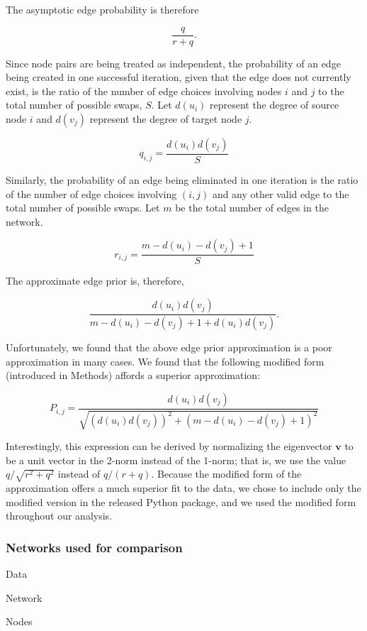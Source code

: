 The asymptotic edge probability is therefore

\[\frac{q}{r + q}.\]

Since node pairs are being treated as independent, the probability of an edge being created in one successful iteration, given that the edge does not currently exist, is the ratio of the number of edge choices involving nodes \(i\) and \(j\) to the total number of possible swaps, \(S\).
Let \(d(u_i)\) represent the degree of source node \(i\) and \(d(v_j)\) represent the degree of target node \(j\).

\[q_{i,j} = \frac{d(u_i)d(v_j)}{S}\]

Similarly, the probability of an edge being eliminated in one iteration is the ratio of the number of edge choices involving \((i,j)\) and any other valid edge to the total number of possible swaps.
Let \(m\) be the total number of edges in the network.

\[r_{i,j} = \frac{m - d(u_i) - d(v_j) + 1}{S}\]

The approximate edge prior is, therefore,

\[\frac{d(u_i)d(v_j)}{m - d(u_i) - d(v_j) + 1 + d(u_i)d(v_j)}.\]

Unfortunately, we found that the above edge prior approximation is a poor approximation in many cases.
We found that the following modified form (introduced in Methods) affords a superior approximation:

\begin{equation}
    P_{i,j} = \frac{d(u_i) d(v_j)}{\sqrt{(d(u_i) d(v_j))^2 + (m - d(u_i) - d(v_j) + 1)^2}}
\end{equation}

Interestingly, this expression can be derived by normalizing the eigenvector \(\mathbf{v}\) to be a unit vector in the 2-norm instead of the 1-norm; that is, we use the value \(q / \sqrt{r^2 + q^2}\) instead of \(q/(r+q)\).
Because the modified form of the approximation offers a much superior fit to the data, we chose to include only the modified version in the released Python package, and we used the modified form throughout our analysis.

\hypertarget{networks}{%
\subsubsection{Networks used for comparison}\label{networks}}

Data

Network

Nodes

